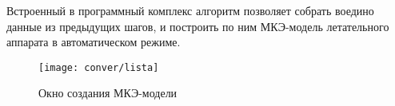  

 Встроенный в программный комплекс алгоритм позволяет собрать воедино данные из предыдущих шагов, и построить по ним МКЭ-модель летательного аппарата в автоматическом режиме. 

\begin{figure}[H]
\centering
\texttt{[image: conver/lista]}
\caption{Окно создания МКЭ-модели}
\label{fig:conver_lista}
\end{figure}

